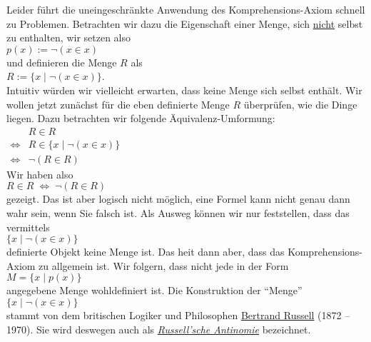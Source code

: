 Leider f\"{u}hrt die uneingeschr\"{a}nkte Anwendung des Komprehensions-Axiom schnell zu
Problemen.  Betrachten wir dazu die Eigenschaft einer Menge, sich \underline{nicht} selbst zu
enthalten, wir setzen also
\\[0.2cm]
\hspace*{1.3cm}
 $p(x) := \neg(x \in x)$ 
\\[0.2cm]
und definieren die Menge $R$ als \\[0.2cm]
\hspace*{1.3cm} $R := \{ x \;|\; \neg (x \in x) \}$.  \\[0.2cm]
Intuitiv w\"{u}rden wir vielleicht erwarten, dass keine Menge sich selbst enth\"{a}lt.  Wir wollen
jetzt zun\"{a}chst f\"{u}r die eben definierte Menge $R$ \"{u}berpr\"{u}fen, wie die Dinge liegen.
Dazu betrachten wir folgende \"{A}quivalenz-Umformung:
\\[0.2cm]
\hspace*{1.3cm}
$
\begin{array}{cl}
                  & R \in R                                      \\[0.2cm] 
  \Leftrightarrow & R \in \bigl\{ x \;|\; \neg (x \in x) \bigr\} \\[0.2cm] 
  \Leftrightarrow & \neg (R \in R)                     
\end{array}
$
\\[0.2cm]
Wir haben also 
\\[0.2cm]
\hspace*{1.3cm}
$R \in R \;\Leftrightarrow\; \neg(R \in R)$
\\[0.2cm]
gezeigt.  Das ist aber logisch nicht m\"{o}glich, eine Formel kann nicht genau dann wahr sein,
wenn Sie falsch ist.  Als Ausweg k\"{o}nnen wir nur feststellen, dass das vermittels \\[0.2cm]
\hspace*{1.3cm} $\{ x \mid \neg (x \in x) \}$ \\[0.2cm]
definierte Objekt keine Menge ist.
Das hei\3t dann aber, dass das Komprehensions-Axiom
zu allgemein ist.  Wir folgern, dass nicht jede  in der Form \\[0.2cm]
\hspace*{1.3cm} $M = \{ x \mid p(x) \}$ \\[0.2cm]
angegebene Menge wohldefiniert ist.  Die Konstruktion der ``Menge''
\\[0.2cm]
\hspace*{1.3cm}
$\bigl\{x \mid \neg(x \in x)\bigr\}$
\\[0.2cm]
stammt von dem britischen Logiker und Philosophen 
\href{http://de.wikipedia.org/wiki/Bertrand_Russell}{Bertrand Russell} (1872 -- 1970).  Sie wird
deswegen auch als \href{http://de.wikipedia.org/wiki/Russellsche_Antinomie}{\emph{Russell'sche Antinomie}}
bezeichnet. 

